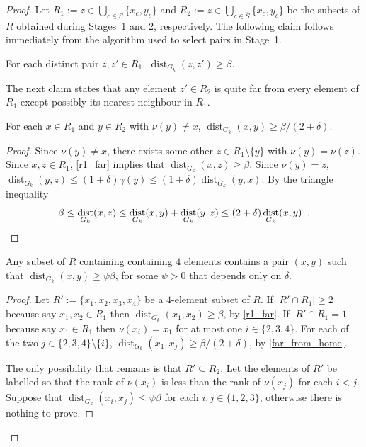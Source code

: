 \documentclass{patmorin}
\DeclareMathOperator{\dist}{dist}
\begin{document}
\begin{proof}
  Let $R_1:=z\in\bigcup_{c\in S}\{x_c,y_c\}$ and $R_2:=z\in\bigcup_{c\in \overline{S}}\{x_c,y_c\}$ be the subsets of $R$ obtained during Stages~1 and 2, respectively. The following claim follows immediately from the algorithm used to select pairs in Stage~1.
  \begin{clm}\label{r1_far}
      For each distinct pair $z,z'\in R_1$, $\dist_{G_k}(z,z')\ge \beta$.
  \end{clm}

  The next claim states that any element $z'\in R_2$ is quite far from every element of $R_1$ except possibly its nearest neighbour in $R_1$.

  \begin{clm}\label{far_from_home}
    For each $x\in R_1$ and $y\in R_2$ with $\nu(y)\neq x$, $\dist_{G_k}(x,y)\ge \beta /(2+\delta)$.
  \end{clm}

  \begin{proof}
    Since $\nu(y)\neq x$, there exists some other $z\in R_1\setminus\{y\}$ with $\nu(y)=\nu(z)$.  Since $x,z\in R_1$, \cref{r1_far} implies that $\dist_{G_k}(x,z)\ge \beta$.  Since $\nu(y)=z$, $\dist_{G_k}(y, z) \le (1+\delta)\gamma(y)\le (1+\delta)\dist_{G_k}(y, x)$.  By the triangle inequality
    \[ \beta \le \dist_{G_k}(x,z)
        \le \dist_{G_k}(x,y)+\dist_{G_k}(y,z)
        \le (2+\delta)\dist_{G_k}(x,y) \enspace . \qedhere
    \]
  \end{proof}


  \begin{clm}
    Any subset of $R$ containing containing $4$ elements contains a pair $(x,y)$ such that $\dist_{G_k}(x,y)\ge \psi\beta$, for some $\psi>0$ that depends only on $\delta$.
  \end{clm}

  \begin{proof}
    Let $R':=\{x_1,x_2,x_3,x_4\}$ be a $4$-element subset of $R$.  If $|R'\cap R_1|\ge 2$ because say $x_1,x_2\in R_1$ then $\dist_{G_k}(x_1,x_2)\ge \beta$, by \cref{r1_far}.  If $|R'\cap R_1=1$ because say $x_1\in R_1$ then $\nu(x_i)= x_1$ for at most one $i\in\{2,3,4\}$. For each of the two $j\in\{2,3,4\}\setminus\{i\}$, $\dist_{G_k}(x_1,x_j)\ge \beta/(2+\delta)$, by \cref{far_from_home}.

    The only possibility that remains is that $R'\subseteq R_2$. Let the elements of $R'$ be labelled so that the rank of $\nu(x_i)$ is less than the rank of $\nu(x_j)$ for each $i<j$. Suppose that $\dist_{G_k}(x_i,x_j)\le \psi\beta$ for each $i,j\in\{1,2,3\}$, otherwise there is nothing to prove.


\end{proof}
\end{proof}
\end{document}
